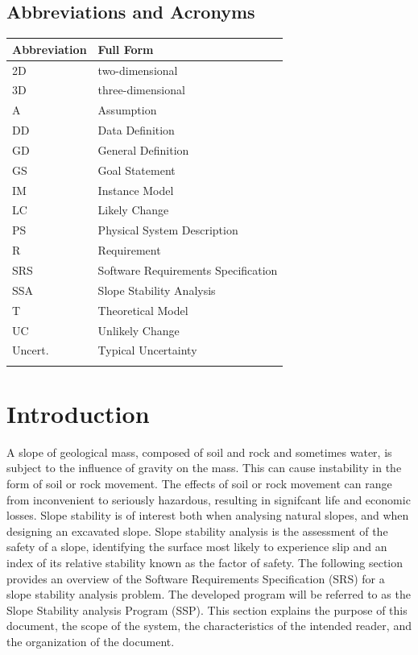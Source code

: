 \documentclass[12pt]{article}
\begin{document}
\subsection{Abbreviations and Acronyms}
\label{Sec:TAbbAcc}
\begin{longtable*}{l l}
\toprule
Abbreviation & Full Form
\\
\midrule
\endhead
2D & two-dimensional
\\
3D & three-dimensional
\\
A & Assumption
\\
DD & Data Definition
\\
GD & General Definition
\\
GS & Goal Statement
\\
IM & Instance Model
\\
LC & Likely Change
\\
PS & Physical System Description
\\
R & Requirement
\\
SRS & Software Requirements Specification
\\
SSA & Slope Stability Analysis
\\
T & Theoretical Model
\\
UC & Unlikely Change
\\
Uncert. & Typical Uncertainty
\\
\bottomrule
\label{Table:TAbbAcc}
\end{longtable*}
\section{Introduction}
\label{Sec:Intro}
A slope of geological mass, composed of soil and rock and sometimes water, is subject to the influence of gravity on the mass. This can cause instability in the form of soil or rock movement. The effects of soil or rock movement can range from inconvenient to seriously hazardous, resulting in signifcant life and economic losses. Slope stability is of interest both when analysing natural slopes, and when designing an excavated slope. Slope stability analysis is the assessment of the safety of a slope, identifying the surface most likely to experience slip and an index of its relative stability known as the factor of safety.
The following section provides an overview of the Software Requirements Specification (SRS) for a slope stability analysis problem. The developed program will be referred to as the Slope Stability analysis Program (SSP). This section explains the purpose of this document, the scope of the system, the characteristics of the intended reader, and the organization of the document.
\end{document}
